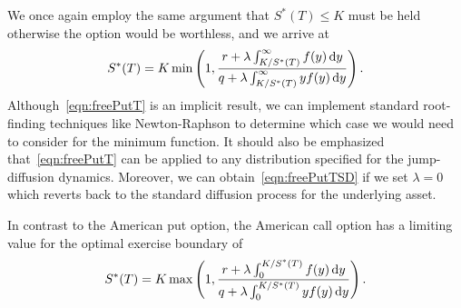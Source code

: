 We once again employ the same argument that $S^*(T) \leq K$ must be held otherwise the option would be worthless, and we arrive at
	\begin{equation}
		\label{eqn:freePutT}
		S^*(T) = K\min\left(1, \frac{r + \lambda\int_{K/S^*(T)}^\infty f(y) \, \mathrm d y}{q + \lambda\int_{K/S^*(T)}^\infty yf(y) \, \mathrm d y} \right).
	\end{equation}
Although~\eqref{eqn:freePutT} is an implicit result, we can implement standard root-finding techniques like Newton-Raphson to determine which case we would need to consider for the minimum function. It should also be emphasized that~\eqref{eqn:freePutT} can be applied to any distribution specified for the jump-diffusion dynamics. Moreover, we can obtain~\eqref{eqn:freePutTSD} if we set $\lambda = 0$ which reverts back to the standard diffusion process for the underlying asset.

In contrast to the American put option, the American call option has a limiting value for the optimal exercise boundary of~\cite{Chiarella2006}
		\begin{equation}
		\label{eqn:freeCallT}
		S^*(T) = K\max\left(1, \frac{r + \lambda\int_0^{K/S^*(T)} f(y) \, \mathrm d y}{q + \lambda\int_0^{K/S^*(T)} yf(y) \, \mathrm d y} \right).
	\end{equation}

